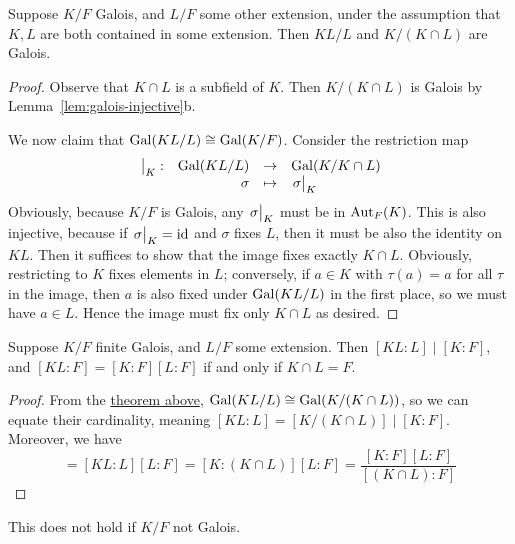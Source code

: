 \begin{theorem}\label{thm:galois-compositum-intersection}
    Suppose \(K/F\) Galois, and \(L/F\) some other extension,
    under the assumption that \(K,L\) are both contained in some extension.
    Then \(KL/L\) and \(K/(K \cap L)\) are Galois.
\end{theorem}
\begin{proof}
    Observe that \(K \cap L\) is a subfield of \(K\).
    Then \(K/(K \cap L)\) is Galois by Lemma~\ref{lem:galois-injective}b.

    We now claim that \(\operatorname{Gal}(KL/L) \cong \operatorname{Gal}(K/F)\).
    Consider the restriction map
    \begin{equation*}
        \varfunc{\eval{}_K}{\Gal(KL/L)}{\Gal(K/K \cap L)}{\sigma}{\eval{\sigma}_K}
    \end{equation*}
    Obviously, because \(K/F\) is Galois, any \(\eval{\sigma}_K\) must be in \(\operatorname{Aut}_F(K)\).
    This is also injective, because if \(\eval{\sigma}_K = \id\) and \(\sigma\) fixes \(L\),
    then it must be also the identity on \(KL\).
    Then it suffices to show that the image fixes exactly \(K \cap L\).
    Obviously, restricting to \(K\) fixes elements in \(L\);
    conversely, if \(a \in K\) with \(\tau(a) = a\) for all \(\tau\) in the image,
    then \(a\) is also fixed under \(\operatorname{Gal}(KL/L)\) in the first place,
    so we must have \(a \in L\).
    Hence the image must fix only \(K \cap L\) as desired.
\end{proof}
\begin{corollary}\label{cor:galois-compositum-degree}
    Suppose \(K/F\) finite Galois, and \(L/F\) some extension.
    Then \([KL:L] \mid [K:F]\), and \([KL:F] = [K:F][L:F]\) if and only if \(K \cap L = F\).
\end{corollary}
\begin{proof}
    From the \hyperref[thm:galois-compositum-intersection]{theorem above},
    \(\operatorname{Gal}(KL/L) \cong \operatorname{Gal}(K/(K \cap L))\),
    so we can equate their cardinality, meaning \([KL:L] = [K/(K \cap L)] \mid [K:F]\).
    Moreover, we have
    \begin{equation*}
        [KL:F] = [KL:L][L:F] = [K:(K \cap L)][L:F] = \frac{[K:F][L:F]}{[(K \cap L):F]}
    \end{equation*}
\end{proof}
\begin{remark}
    This does not hold if \(K/F\) not Galois.
\end{remark}

